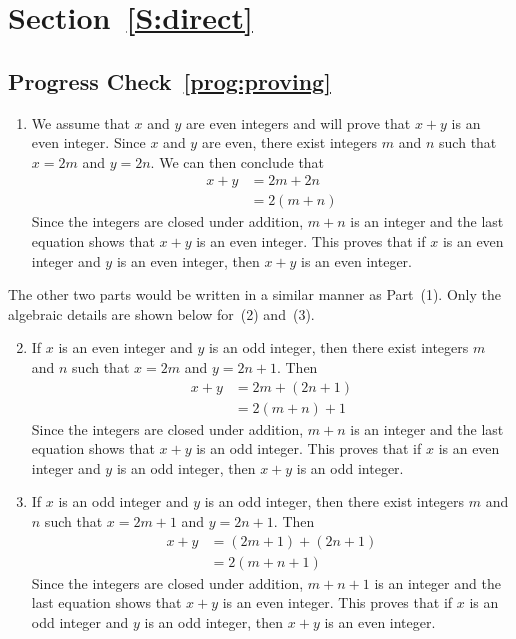\section*{Section~\ref{S:direct}}

\subsection*{Progress Check~\ref{prog:proving}}
\begin{enumerate}
  \item We assume that $x$ and $y$ are even integers and will prove that $x+y$ is an even integer.  Since $x$ and $y$ are even, there exist integers $m$ and $n$ such that $x = 2m$ and $y = 2n$.  We can then conclude that
\begin{align*}
x + y &= 2m + 2n\\
        &= 2(m + n)
\end{align*}
Since the integers are closed under addition, $m + n$ is an integer and the last equation shows that $x + y$ is an even integer.  This proves that if $x$ is an even integer and $y$ is an even integer, then $x + y$ is an even integer.
\end{enumerate}
The other two parts would be written in a similar manner as Part~(1).  Only the algebraic details are shown below for~(2) and~(3).
\begin{enumerate} \setcounter{enumi}{1}
  \item If $x$ is an even integer and $y$ is an odd integer, then there exist integers $m$ and $n$ such that $x = 2m$ and $y = 2n+1$.  Then
\begin{align*}
x + y &= 2m + (2n + 1) \\
         &= 2(m + n) + 1
\end{align*}
Since the integers are closed under addition, $m + n$ is an integer and the last equation shows that $x + y$ is an odd integer.  This proves that if $x$ is an even integer and $y$ is an odd integer, then $x + y$ is an odd integer.
  \item If $x$ is an odd integer and $y$ is an odd integer, then there exist integers $m$ and $n$ such that $x = 2m+1$ and $y = 2n+1$.  Then
\begin{align*}
x + y &= (2m+1) + (2n + 1) \\
         &= 2(m + n + 1)
\end{align*}
Since the integers are closed under addition, $m + n+1$ is an integer and the last equation shows that $x + y$ is an even integer.  This proves that if $x$ is an odd integer and $y$ is an odd integer, then $x + y$ is an even integer.

\end{enumerate}


